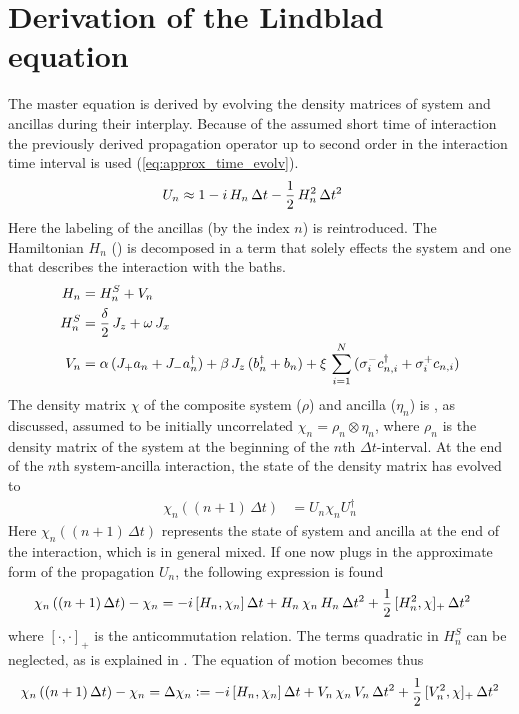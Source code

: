 \section{Derivation of the Lindblad equation}%
The master equation is derived by evolving the density matrices of system and ancillas during their interplay. Because of the assumed short time of interaction the previously derived propagation operator up to second order in the interaction time interval is used (\ref{eq:approx_time_evolv}).
\begin{align}
    U_n &\approx 1-i\,H_n \,\Delta t-\frac{1}{2}\,H_n^2\,\Delta t^2
\end{align}
Here the labeling of the ancillas (by the index $n$) is reintroduced.
The Hamiltonian $H_n$ () is decomposed in a term that solely effects the system and one that describes the interaction with the baths.
\begin{align}\label{eq:Ham_split}
    H_n &= H_n^S + V_n\notag\\
    H_n^S&=\frac{\delta}{2}\,J_z+\omega\,J_x\notag\\
    V_n&= \alpha\,(J_+a_n + J_-a_n^\dagger)+ \beta\,J_z\,(b_n^\dagger+b_n)+\xi\,\sum_{i=1}^N\,(\sigma_{i}^-c_{n,i}^\dagger+\sigma_i^+c_{n,i})
\end{align}
The density matrix $\chi$ of the composite system ($\rho$) and ancilla ($\eta_n$) is , as discussed, assumed to be initially uncorrelated $\chi_n=\rho_n\otimes\eta_n$, where $\rho_n$ is the density matrix of the system at the beginning of the $n$th $\Delta t$-interval. At the end of the $n$th system-ancilla interaction, the state of the density matrix has evolved to
\begin{align*}
    \chi_n\left((n+1)\,\Delta t\right)&=U_n\chi_nU_n^\dagger
\end{align*}
Here $ \chi_n((n+1)\,\Delta t)$ represents the state of system and ancilla at the end of the interaction, which is in general mixed.
If one now plugs in the approximate form of the propagation $U_n$, the following expression is found
\begin{align*}
    \chi_n\left((n+1)\,\Delta t\right)-\chi_n&=-i\,[H_n,\chi_n]\,\Delta t+H_n\,\chi_n\,H_n\,\Delta t^2+\frac{1}{2}\,[H_n^2,\chi]_+\,\Delta t^2
\end{align*}
where $[\cdot,\cdot]_+$ is the anticommutation relation. The terms quadratic in $H_n^S$ can be neglected, as is explained in \cite{ciccarello_quantum_2022}. The equation of motion becomes thus
\begin{align}
    \chi_n\left((n+1)\,\Delta t\right)-\chi_n=\Delta\chi_n\vcentcolon=-i\,[H_n,\chi_n]\,\Delta t+V_n\,\chi_n\,V_n\,\Delta t^2+\frac{1}{2}\,[V_n^2,\chi]_+\,\Delta t^2\label{eq:pre_lindblad}
\end{align}
